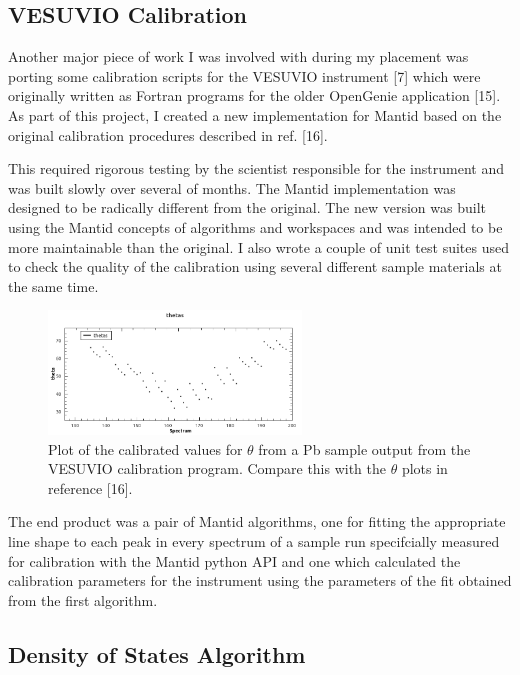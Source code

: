 \documentclass[paper=a4, fontsize=11pt]{scrartcl}	%
\numberwithin{equation}{section}															%
\numberwithin{figure}{section}																%
\numberwithin{table}{section}
\begin{document}
\subsection{VESUVIO Calibration}\label{vesuvio-calibration}

Another major piece of work I was involved with during my placement was
porting some calibration scripts for the VESUVIO instrument {[}7{]} which were
originally written as Fortran programs for the older OpenGenie
application {[}15{]}. As part of this project, I created a new
implementation for Mantid based on the original calibration procedures
described in ref. {[}16{]}.

This required rigorous testing by the scientist responsible for the
instrument and was built slowly over several of months. The Mantid
implementation was designed to be radically different from the original.
The new version was built using the Mantid concepts of algorithms and
workspaces and was intended to be more maintainable than the original. I
also wrote a couple of unit test suites used to check the quality of the
calibration using several different sample materials at the same time.

\begin{figure}[H]
\centering
\includegraphics[width=0.6\textwidth]{img/calib-theta.png}
\caption{Plot of the calibrated values for $\theta$ from a Pb sample output from the VESUVIO calibration program. Compare this with the $\theta$ plots in reference {[}16{]}.}
\label{fig:calib-theta}
\end{figure}

The end product was a pair of Mantid algorithms, one for fitting the
appropriate line shape to each peak in every spectrum of a sample run
specifcially measured for calibration with the Mantid python API and one
which calculated the calibration parameters for the instrument using the
parameters of the fit obtained from the first algorithm.

\subsection{Density of States
Algorithm}\label{density-of-states-algorithm}
\end{document}
